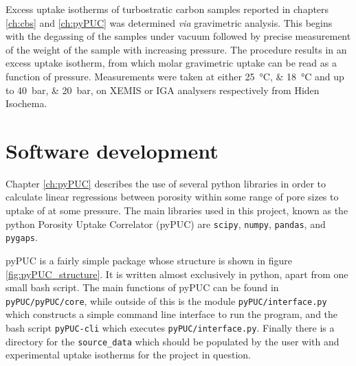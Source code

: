 Excess  uptake isotherms of \gls{turbostratic carbon} samples reported in chapters \ref{ch:cbs} and \ref{ch:pyPUC} was determined \textit{via} gravimetric analysis. This begins with the degassing of the samples under vacuum followed by precise measurement of the weight of the sample with increasing  pressure. The procedure results in an excess  uptake isotherm, from which molar gravimetric uptake can be read as a function of pressure. Measurements were taken at either \qtylist[list-pair-separator={ or }, list-units=single]{25;18}{\degreeCelsius} and up to \qtylist[list-pair-separator={ or }, list-units=single]{40;20}{\bar}, on XEMIS or IGA analysers respectively from Hiden Isochema. 

\section{Software development}
Chapter \ref{ch:pyPUC} describes the use of several python libraries in order to calculate linear regressions between porosity within some range of pore sizes to uptake of  at some pressure. The main libraries used in this project, known as the python Porosity Uptake Correlator (pyPUC) are \verb|scipy|,\citep{SciPy2020} \verb|numpy|,\citep{numpy2022} \verb|pandas|,\citep{pandas2010} and \verb|pygaps|.\citep{Iacomi2019pyGAPS}

pyPUC is a fairly simple package whose structure is shown in figure \ref{fig:pyPUC_structure}. It is written almost exclusively in python,\citep{python1995} apart from one small bash script.\citep{bash2007} The main functions of pyPUC can be found in \verb|pyPUC/pyPUC/core|, while outside of this is the module \verb|pyPUC/interface.py| which constructs a simple command line interface to run the program, and the bash script \verb|pyPUC-cli| which executes \verb|pyPUC/interface.py|. Finally there is a directory for the \verb|source_data| which should be populated by the user with  and experimental uptake isotherms for the project in question.

